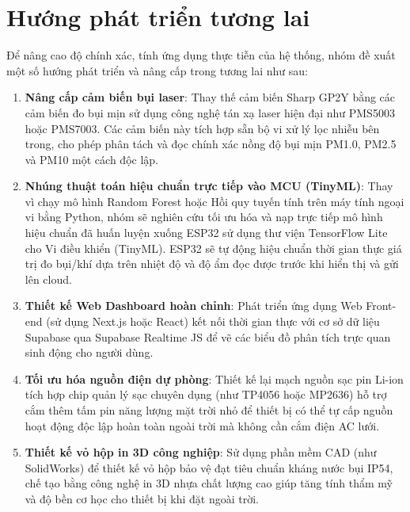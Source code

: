 \section{Hướng phát triển tương lai}
Để nâng cao độ chính xác, tính ứng dụng thực tiễn của hệ thống, nhóm đề xuất một số hướng phát triển và nâng cấp trong tương lai như sau:
\begin{enumerate}
    \item \textbf{Nâng cấp cảm biến bụi laser}: Thay thế cảm biến Sharp GP2Y bằng các cảm biến đo bụi mịn sử dụng công nghệ tán xạ laser hiện đại như PMS5003 hoặc PMS7003. Các cảm biến này tích hợp sẵn bộ vi xử lý lọc nhiễu bên trong, cho phép phân tách và đọc chính xác nồng độ bụi mịn PM1.0, PM2.5 và PM10 một cách độc lập.
    \item \textbf{Nhúng thuật toán hiệu chuẩn trực tiếp vào MCU (TinyML)}: Thay vì chạy mô hình Random Forest hoặc Hồi quy tuyến tính trên máy tính ngoại vi bằng Python, nhóm sẽ nghiên cứu tối ưu hóa và nạp trực tiếp mô hình hiệu chuẩn đã huấn luyện xuống ESP32 sử dụng thư viện TensorFlow Lite cho Vi điều khiển (TinyML). ESP32 sẽ tự động hiệu chuẩn thời gian thực giá trị đo bụi/khí dựa trên nhiệt độ và độ ẩm đọc được trước khi hiển thị và gửi lên cloud.
    \item \textbf{Thiết kế Web Dashboard hoàn chỉnh}: Phát triển ứng dụng Web Front-end (sử dụng Next.js hoặc React) kết nối thời gian thực với cơ sở dữ liệu Supabase qua Supabase Realtime JS để vẽ các biểu đồ phân tích trực quan sinh động cho người dùng.
    \item \textbf{Tối ưu hóa nguồn điện dự phòng}: Thiết kế lại mạch nguồn sạc pin Li-ion tích hợp chip quản lý sạc chuyên dụng (như TP4056 hoặc MP2636) hỗ trợ cắm thêm tấm pin năng lượng mặt trời nhỏ để thiết bị có thể tự cấp nguồn hoạt động độc lập hoàn toàn ngoài trời mà không cần cắm điện AC lưới.
    \item \textbf{Thiết kế vỏ hộp in 3D công nghiệp}: Sử dụng phần mềm CAD (như SolidWorks) để thiết kế vỏ hộp bảo vệ đạt tiêu chuẩn kháng nước bụi IP54, chế tạo bằng công nghệ in 3D nhựa chất lượng cao giúp tăng tính thẩm mỹ và độ bền cơ học cho thiết bị khi đặt ngoài trời.
\end{enumerate}
